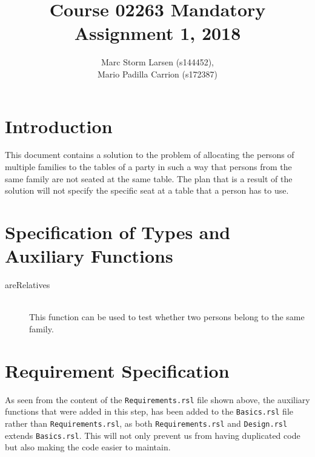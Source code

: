 \documentclass[a4]{article}
\title{Course 02263 Mandatory Assignment 1, 2018}
\author{Marc Storm Larsen (s144452),\\ 
        Mario Padilla Carrion (s172387)}
\begin{document}
\maketitle

\tableofcontents
\newpage

\section{Introduction}
This document contains a solution to the problem of allocating the persons of multiple families to the tables of a party in such a way that persons from the same family are not seated at the same table. The plan that is a result of the solution will not specify the specific seat at a table that a person has to use.

\section{Specification of Types and Auxiliary Functions}

  

\begin{description}
  \item[areRelatives] \hfill \\ This function can be used to test whether two persons belong to the same family.
\end{description}

\section{Requirement Specification}

  

As seen from the content of the \verb=Requirements.rsl= file shown above, the auxiliary functions that were added in this step, has been added to the \verb=Basics.rsl= file rather than \verb=Requirements.rsl=, as both \verb=Requirements.rsl= and \verb=Design.rsl= extends \verb=Basics.rsl=. This will not only prevent us from having duplicated code but also making the code easier to maintain.
\end{document}
